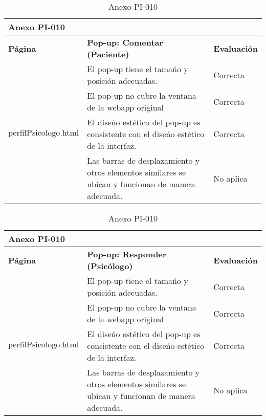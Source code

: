 \begin{table}[htpb]
\centering
\begin{tabularx}{\textwidth}{|l|X|l|}
\hline
\multicolumn{3}{|l|}{\textbf{Anexo PI-010}}                                                                                                                       \\ \hline
\textbf{Página}                       & \textbf{Pop-up: Comentar (Paciente)}                                                               & \textbf{Evaluación} \\ \hline
\multirow{4}{*}{perfilPsicologo.html} & El pop-up tiene el tamańo y posición adecuadas.                                                    & Correcta            \\ \cline{2-3} 
                                      & El pop-up no cubre la ventana de la webapp original                                                & Correcta            \\ \cline{2-3} 
                                      & El diseńo estético del pop-up es consistente con el diseńo estético de la interfaz.                & Correcta            \\ \cline{2-3} 
                                      & Las barras de desplazamiento y otros elementos similares se ubican y funcionan de manera adecuada. & No aplica           \\ \hline
\end{tabularx}
\caption{Anexo PI-010}
\end{table}

%
\begin{table}[htpb]
\centering
\begin{tabularx}{\textwidth}{|l|X|l|}
\hline
\multicolumn{3}{|l|}{\textbf{Anexo PI-010}}                                                                                                                       \\ \hline
\textbf{Página}                       & \textbf{Pop-up: Responder (Psicólogo)}                                                             & \textbf{Evaluación} \\ \hline
\multirow{4}{*}{perfilPsicologo.html} & El pop-up tiene el tamańo y posición adecuadas.                                                    & Correcta            \\ \cline{2-3} 
                                      & El pop-up no cubre la ventana de la webapp original                                                & Correcta            \\ \cline{2-3} 
                                      & El diseńo estético del pop-up es consistente con el diseńo estético de la interfaz.                & Correcta            \\ \cline{2-3} 
                                      & Las barras de desplazamiento y otros elementos similares se ubican y funcionan de manera adecuada. & No aplica           \\ \hline
\end{tabularx}
\caption{Anexo PI-010}
\end{table}

